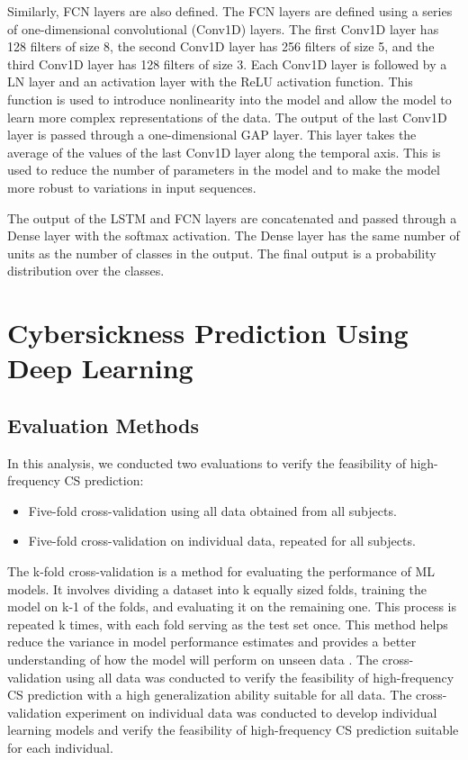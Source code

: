 \documentclass{ieeeaccess}
\begin{document}
Similarly, FCN layers are also defined. The FCN layers are defined using a series of one-dimensional convolutional (Conv1D) layers. The first Conv1D layer has 128 filters of size 8, the second Conv1D layer has 256 filters of size 5, and the third Conv1D layer has 128 filters of size 3. Each Conv1D layer is followed by a LN layer and an activation layer with the ReLU activation function. This function is used to introduce nonlinearity into the model and allow the model to learn more complex representations of the data. The output of the last Conv1D layer is passed through a one-dimensional GAP layer. This layer takes the average of the values of the last Conv1D layer along the temporal axis. This is used to reduce the number of parameters in the model and to make the model more robust to variations in input sequences. 

The output of the LSTM and FCN layers are concatenated and passed through a Dense layer with the softmax activation. The Dense layer has the same number of units as the number of classes in the output. The final output is a probability distribution over the classes.




\section{Cybersickness Prediction Using Deep Learning}

\subsection{Evaluation Methods}
In this analysis, we conducted two evaluations to verify the feasibility of high-frequency CS prediction: 
\begin{itemize}
    \item Five-fold cross-validation using all data obtained from all subjects.
    \item Five-fold cross-validation on individual data, repeated for all subjects.
\end{itemize}
The k-fold cross-validation is a method for evaluating the performance of ML models. It involves dividing a dataset into k equally sized folds, training the model on k-1 of the folds, and evaluating it on the remaining one. This process is repeated k times, with each fold serving as the test set once. This method helps reduce the variance in model performance estimates and provides a better understanding of how the model will perform on unseen data \cite{Bengio_2004}.
The cross-validation using all data was conducted to verify the feasibility of high-frequency CS prediction with a high generalization ability suitable for all data. The cross-validation experiment on individual data was conducted to develop individual learning models and verify the feasibility of high-frequency CS prediction suitable for each individual. 
\end{document}
